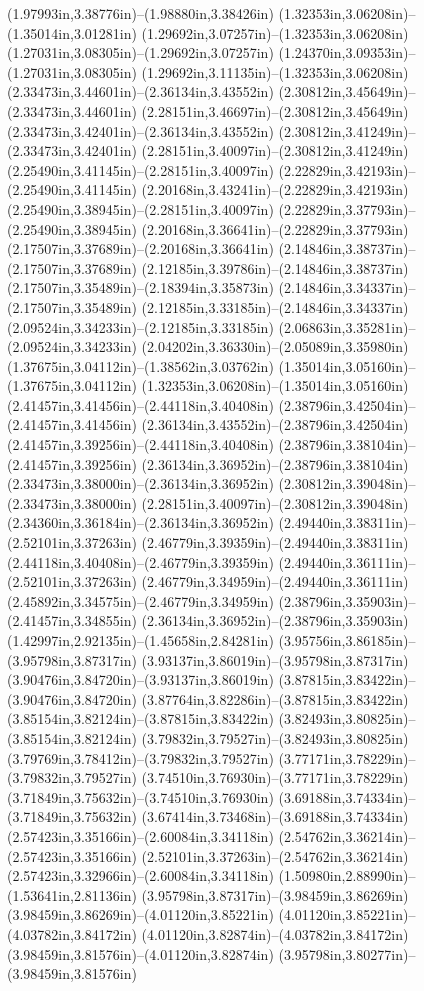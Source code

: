 (1.97993in,3.38776in)--(1.98880in,3.38426in) (1.32353in,3.06208in)--(1.35014in,3.01281in) (1.29692in,3.07257in)--(1.32353in,3.06208in) (1.27031in,3.08305in)--(1.29692in,3.07257in) (1.24370in,3.09353in)--(1.27031in,3.08305in) (1.29692in,3.11135in)--(1.32353in,3.06208in) (2.33473in,3.44601in)--(2.36134in,3.43552in) (2.30812in,3.45649in)--(2.33473in,3.44601in) (2.28151in,3.46697in)--(2.30812in,3.45649in) (2.33473in,3.42401in)--(2.36134in,3.43552in) (2.30812in,3.41249in)--(2.33473in,3.42401in) (2.28151in,3.40097in)--(2.30812in,3.41249in) (2.25490in,3.41145in)--(2.28151in,3.40097in) (2.22829in,3.42193in)--(2.25490in,3.41145in) (2.20168in,3.43241in)--(2.22829in,3.42193in) (2.25490in,3.38945in)--(2.28151in,3.40097in) (2.22829in,3.37793in)--(2.25490in,3.38945in) (2.20168in,3.36641in)--(2.22829in,3.37793in) (2.17507in,3.37689in)--(2.20168in,3.36641in) (2.14846in,3.38737in)--(2.17507in,3.37689in) (2.12185in,3.39786in)--(2.14846in,3.38737in) (2.17507in,3.35489in)--(2.18394in,3.35873in) (2.14846in,3.34337in)--(2.17507in,3.35489in) (2.12185in,3.33185in)--(2.14846in,3.34337in) (2.09524in,3.34233in)--(2.12185in,3.33185in) (2.06863in,3.35281in)--(2.09524in,3.34233in) (2.04202in,3.36330in)--(2.05089in,3.35980in) (1.37675in,3.04112in)--(1.38562in,3.03762in) (1.35014in,3.05160in)--(1.37675in,3.04112in) (1.32353in,3.06208in)--(1.35014in,3.05160in) (2.41457in,3.41456in)--(2.44118in,3.40408in) (2.38796in,3.42504in)--(2.41457in,3.41456in) (2.36134in,3.43552in)--(2.38796in,3.42504in) (2.41457in,3.39256in)--(2.44118in,3.40408in) (2.38796in,3.38104in)--(2.41457in,3.39256in) (2.36134in,3.36952in)--(2.38796in,3.38104in) (2.33473in,3.38000in)--(2.36134in,3.36952in) (2.30812in,3.39048in)--(2.33473in,3.38000in) (2.28151in,3.40097in)--(2.30812in,3.39048in) (2.34360in,3.36184in)--(2.36134in,3.36952in) (2.49440in,3.38311in)--(2.52101in,3.37263in) (2.46779in,3.39359in)--(2.49440in,3.38311in) (2.44118in,3.40408in)--(2.46779in,3.39359in) (2.49440in,3.36111in)--(2.52101in,3.37263in) (2.46779in,3.34959in)--(2.49440in,3.36111in) (2.45892in,3.34575in)--(2.46779in,3.34959in) (2.38796in,3.35903in)--(2.41457in,3.34855in) (2.36134in,3.36952in)--(2.38796in,3.35903in) (1.42997in,2.92135in)--(1.45658in,2.84281in) (3.95756in,3.86185in)--(3.95798in,3.87317in) (3.93137in,3.86019in)--(3.95798in,3.87317in) (3.90476in,3.84720in)--(3.93137in,3.86019in) (3.87815in,3.83422in)--(3.90476in,3.84720in) (3.87764in,3.82286in)--(3.87815in,3.83422in) (3.85154in,3.82124in)--(3.87815in,3.83422in) (3.82493in,3.80825in)--(3.85154in,3.82124in) (3.79832in,3.79527in)--(3.82493in,3.80825in) (3.79769in,3.78412in)--(3.79832in,3.79527in) (3.77171in,3.78229in)--(3.79832in,3.79527in) (3.74510in,3.76930in)--(3.77171in,3.78229in) (3.71849in,3.75632in)--(3.74510in,3.76930in) (3.69188in,3.74334in)--(3.71849in,3.75632in) (3.67414in,3.73468in)--(3.69188in,3.74334in) (2.57423in,3.35166in)--(2.60084in,3.34118in) (2.54762in,3.36214in)--(2.57423in,3.35166in) (2.52101in,3.37263in)--(2.54762in,3.36214in) (2.57423in,3.32966in)--(2.60084in,3.34118in) (1.50980in,2.88990in)--(1.53641in,2.81136in) (3.95798in,3.87317in)--(3.98459in,3.86269in) (3.98459in,3.86269in)--(4.01120in,3.85221in) (4.01120in,3.85221in)--(4.03782in,3.84172in) (4.01120in,3.82874in)--(4.03782in,3.84172in) (3.98459in,3.81576in)--(4.01120in,3.82874in) (3.95798in,3.80277in)--(3.98459in,3.81576in) 